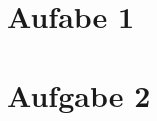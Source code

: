 \documentclass[10pt,oneside,a4paper]{article}
\begin{document}
  \section{Aufabe 1}
  \section{Aufgabe 2}
\end{document}
